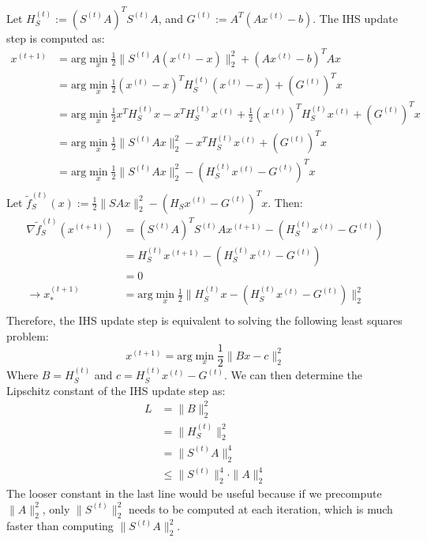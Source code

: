 \documentclass[11pt]{article}
\begin{document}
\noindent Let $H_S^{(t)} := (S^{(t)}A)^TS^{(t)}A$, and $G^{(t)} := A^T(Ax^{(t)}-b)$.
The IHS update step is computed as:
\begin{equation*}
  \begin{aligned}
    x^{(t+1)} &= \text{arg}\min_x \frac{1}{2}\|S^{(t)}A(x^{(t)}-x)\|_2^2 + (Ax^{(t)}-b)^TAx \\
    &= \text{arg}\min_x \frac{1}{2}(x^{(t)}-x)^T H_S^{(t)} (x^{(t)}-x) + (G^{(t)})^Tx \\
    &= \text{arg}\min_x \frac{1}{2}x^TH_S^{(t)}x - x^TH_S^{(t)}x^{(t)} + \frac{1}{2}(x^{(t)})^TH_S^{(t)}x^{(t)} + (G^{(t)})^T x \\
    &= \text{arg}\min_x \frac{1}{2}\|S^{(t)}Ax\|_2^2 - x^TH_S^{(t)}x^{(t)} + (G^{(t)})^T x \\
    &= \text{arg}\min_x \frac{1}{2}\|S^{(t)}Ax\|_2^2 - (H_S^{(t)}x^{(t)} - G^{(t)})^T x \\
  \end{aligned}
\end{equation*}
Let $\tilde{f}_S^{(t)}(x) := \frac{1}{2}\|SAx\|_2^2 - (H_Sx^{(t)} - G^{(t)})^T x$. Then:
\begin{equation*}
  \begin{aligned}
    \nabla \tilde{f}_S^{(t)}(x^{(t+1)}) &= (S^{(t)}A)^TS^{(t)}Ax^{(t+1)} - (H_S^{(t)}x^{(t)} - G^{(t)}) \\
    &= H_S^{(t)}x^{(t+1)} - (H_S^{(t)}x^{(t)} - G^{(t)}) \\
    &= 0 \\
    \rightarrow x_*^{(t+1)} &= \text{arg}\min_x \frac{1}{2}\|H_S^{(t)}x - (H_S^{(t)}x^{(t)} - G^{(t)})\|_2^2 \\
  \end{aligned}
\end{equation*}
Therefore, the IHS update step is equivalent to solving the following least squares problem:
\begin{equation*}
  x^{(t+1)} = \text{arg}\min_x \frac{1}{2}\|Bx - c\|_2^2
\end{equation*}
Where $B = H_S^{(t)}$ and $c = H_S^{(t)}x^{(t)} - G^{(t)}$.
We can then determine the Lipschitz constant of the IHS update step as:
\begin{equation*}
  \begin{aligned}
    L &= \|B\|_2^2 \\
    &= \|H_S^{(t)}\|_2^2 \\
    &= \|S^{(t)}A\|_2^4 \\
    &\leq \|S^{(t)}\|_2^4 \cdot \|A\|_2^4
  \end{aligned}
\end{equation*}
The looser constant in the last line would be useful because if we precompute $\|A\|_2^2$,
only $\|S^{(t)}\|_2^2$ needs to be computed at each iteration, which is much faster than computing
$\|S^{(t)}A\|_2^2$.
\end{document}
